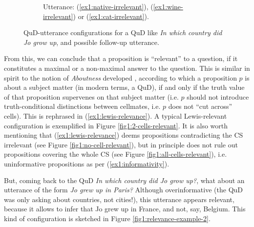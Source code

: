 \begin{figure}[H]
\begin{subfigure}[r]{.24\linewidth}
		\caption{Utterance: (\ref{ex1:native-irrelevant}), (\ref{ex1:wine-irrelevant}) or (\ref{ex1:cat-irrelevant}).}
	\end{subfigure}
	\caption{QuD-utterance configurations for a QuD like \textit{In which country did Jo grow up}, and possible follow-up utterance.}\label{fig1:relevance-example}
\end{figure}

From this, we can conclude that a proposition is ``relevant'' to a question, if it constitutes a maximal or a non-maximal answer to the question. This is similar in spirit to the notion of \textit{Aboutness} developed \cite{Lewis1988}, according to which a proposition $p$ is about a subject matter (in modern terms, a QuD), if and only if the truth value of that proposition supervenes on
that subject matter (i.e. $p$ should not introduce truth-conditional distinctions between cellmates, i.e. $p$ does not ``cut across'' cells). This is rephrased in (\ref{ex1:lewis-relevance}). A typical Lewis-relevant configuration is exemplified in Figure \ref{fig1:2-cells-relevant}. It is also worth mentioning that (\ref{ex1:lewis-relevance}) deems propositions contradicting the CS irrelevant (see Figure \ref{fig1:no-cell-relevant}), but in principle does not rule out propositions covering the whole CS (see Figure \ref{fig1:all-cells-relevant}), i.e. uninformative propositions as per (\ref{ex1:informativity}).

\begin{exe}
	\label{ex1:lewis-relevance}
\end{exe}


But, coming back to the QuD \textit{In which country did Jo grow up?}, what about an utterance of the form \textit{Jo grew up in Paris?} Although overinformative (the QuD was only asking about countries, not cities!), this utterance appears relevant, because it allows to infer that Jo grew up in France, and not, say, Belgium. This kind of configuration is sketched in Figure \ref{fig1:relevance-example-2}.

